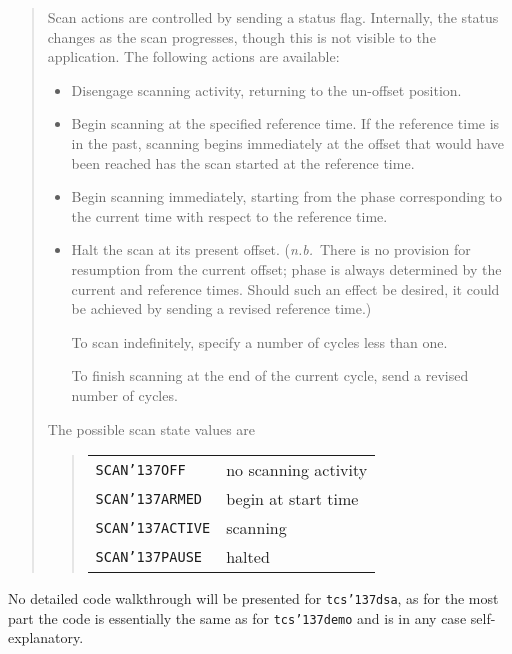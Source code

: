 \documentclass[12pt,fleqn,twoside]{article}
\renewcommand{\_}{{\tt\char'137}}     %
\begin{document}
\begin{quote}
     Scan actions are controlled by sending a status flag.
     Internally, the status changes as the scan progresses, though
     this is not visible to the application.  The following actions
     are available:
     \begin{itemize}
     \item Disengage scanning activity, returning to the un-offset
           position.
     \item Begin scanning at the specified reference time.  If
           the reference time is in the past, scanning begins
           immediately at the offset that would have been reached
           has the scan started at the reference time.
     \item Begin scanning immediately, starting from the phase
           corresponding to the current time with respect to the
           reference time.
     \item Halt the scan at its present offset.  ({\it n.b.}~There is no
           provision for resumption from the current offset;  phase
           is always determined by the current and reference times.
           Should such an effect be desired, it could be achieved
           by sending a revised reference time.)

           To scan indefinitely, specify a number of cycles less than
           one.

           To finish scanning at the end of the current cycle, send a
           revised number of cycles.
     \end{itemize}
     The possible scan state values are
     \begin{quote}
     \begin{tabular}{ll}
        {\tt SCAN\_OFF   } & no scanning activity \\
        {\tt SCAN\_ARMED } & begin at start time \\
        {\tt SCAN\_ACTIVE} & scanning \\
        {\tt SCAN\_PAUSE } & halted \\
     \end{tabular}
     \end{quote}
\end{quote}
No detailed code walkthrough will be presented
for {\tt tcs\_dsa}, as for the most part
the code is essentially the same as for {\tt tcs\_demo} and is in any
case self-explanatory.

\end{document}
